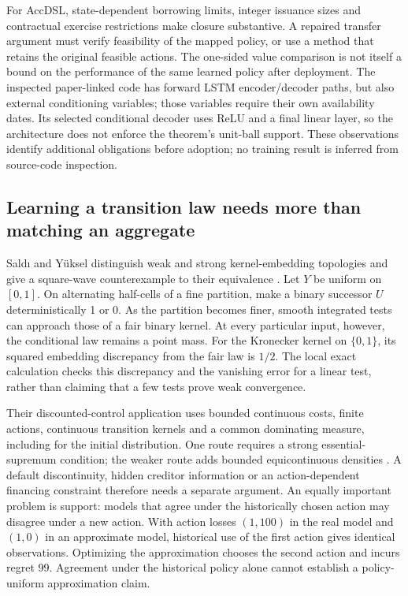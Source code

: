 \documentclass[11pt,a4paper]{article}
\begin{document}
For AccDSL, state-dependent borrowing limits, integer issuance sizes and
contractual exercise restrictions make closure substantive. A repaired transfer
argument must verify feasibility of the mapped policy, or use a method that
retains the original feasible actions. The one-sided value comparison is not
itself a bound on the performance of the same learned policy after deployment.
The inspected paper-linked code has forward LSTM encoder/decoder paths, but
also external conditioning variables; those variables require their own
availability dates. Its selected conditional decoder uses ReLU and a final
linear layer, so the architecture does not enforce the theorem's unit-ball
support. These observations identify additional obligations before adoption;
no training result is inferred from source-code inspection.

\subsection{Learning a transition law needs more than matching an aggregate}
Sald\i{} and Y\"uksel distinguish weak and strong kernel-embedding topologies
and give a square-wave counterexample to their equivalence
\cite[Theorem~4.1 and proof]{kerneltop}. Let $Y$ be uniform on $[0,1]$.
On alternating half-cells of a fine partition, make a binary successor $U$
deterministically 1 or 0. As the partition becomes finer, smooth integrated
tests can approach those of a fair binary kernel. At every particular input,
however, the conditional law remains a point mass. For the Kronecker kernel
on $\{0,1\}$, its squared embedding discrepancy from the fair law is $1/2$.
The local exact calculation checks this discrepancy and the vanishing error
for a linear test, rather than claiming that a few tests prove weak convergence.

Their discounted-control application uses bounded continuous costs, finite
actions, continuous transition kernels and a common dominating measure, including
for the initial distribution. One route requires a strong essential-supremum
condition; the weaker route adds bounded equicontinuous densities
\cite[Assumptions~2--4, equation~(11), Theorems~5.1--5.2]{kerneltop}.
A default discontinuity, hidden creditor information or an action-dependent
financing constraint therefore needs a separate argument. An equally important
problem is support: models that agree under the historically chosen action may
disagree under a new action. With action losses $(1,100)$ in the real model and
$(1,0)$ in an approximate model, historical use of the first action gives
identical observations. Optimizing the approximation chooses the second action
and incurs regret 99. Agreement under the historical policy alone cannot
establish a policy-uniform approximation claim.
\end{document}
